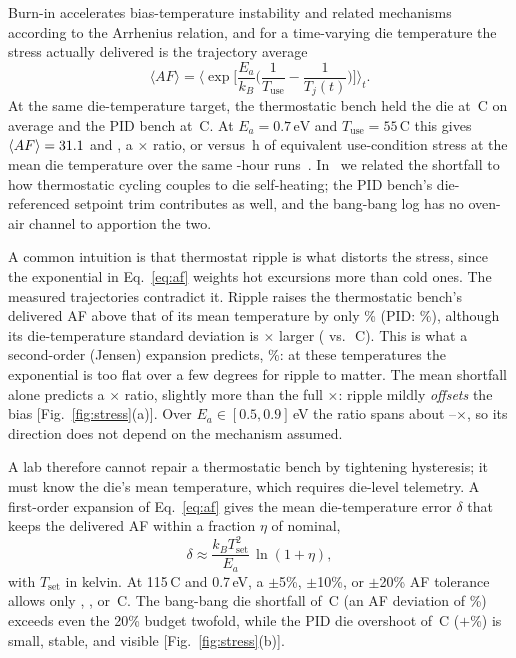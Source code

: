 \documentclass[10pt,twocolumn]{article}
\newcommand{\degC}{\,\textdegree C}
\newcommand{\unit}[1]{\,\mathrm{#1}}
\begin{document}
Burn-in accelerates bias-temperature instability and related mechanisms according to the Arrhenius relation, and for a time-varying die temperature the stress actually delivered is the trajectory average
\begin{equation}
\langle AF\rangle=\Big\langle \exp\!\Big[\frac{E_a}{k_B}\Big(\frac{1}{T_{\mathrm{use}}}-\frac{1}{T_j(t)}\Big)\Big]\Big\rangle_t .
\label{eq:af}
\end{equation}
At the same die-temperature target, the thermostatic bench held the die at \vTBB\degC{} on average and the PID bench at \vTPID\degC. At $E_a=0.7\unit{eV}$ and $T_{\mathrm{use}}=55$\degC{} this gives $\langle AF\rangle=31.1$ and \vAFPID, a \vAFratio$\times$ ratio, or \vEqhBB{} versus \vEqhPID\,h of equivalent use-condition stress at the mean die temperature over the same \vDurPair-hour runs~\cite{sbcci26}. In~\cite{sbcci26} we related the shortfall to how thermostatic cycling couples to die self-heating; the PID bench's die-referenced setpoint trim contributes as well, and the bang-bang log has no oven-air channel to apportion the two.

A common intuition is that thermostat ripple is what distorts the stress, since the exponential in Eq.~\eqref{eq:af} weights hot excursions more than cold ones. The measured trajectories contradict it. Ripple raises the thermostatic bench's delivered AF above that of its mean temperature by only \vRippleBB\% (PID: \vRipplePID\%), although its die-temperature standard deviation is \vTsdRatio$\times$ larger (\vTsdBB{} vs.\ \vTsdPID\degC). This is what a second-order (Jensen) expansion predicts, \vJensen\%: at these temperatures the exponential is too flat over a few degrees for ripple to matter. The mean shortfall alone predicts a \vAFratioMeanOnly$\times$ ratio, slightly more than the full \vAFratio$\times$: ripple mildly \emph{offsets} the bias [Fig.~\ref{fig:stress}(a)]. Over $E_a\in[0.5,0.9]$\,eV the ratio spans about \vAFratioLoOne--\vAFratioHiOne$\times$, so its direction does not depend on the mechanism assumed.

A lab therefore cannot repair a thermostatic bench by tightening hysteresis; it must know the die's mean temperature, which requires die-level telemetry. A first-order expansion of Eq.~\eqref{eq:af} gives the mean die-temperature error $\delta$ that keeps the delivered AF within a fraction $\eta$ of nominal,
\begin{equation}
\delta\approx\frac{k_B T_{\mathrm{set}}^2}{E_a}\,\ln(1+\eta),
\label{eq:delta}
\end{equation}
with $T_{\mathrm{set}}$ in kelvin. At 115\degC{} and 0.7\,eV, a $\pm$5\%, $\pm$10\%, or $\pm$20\% AF tolerance allows only \vDeltaFive, \vDeltaTen, or \vDeltaTwenty\degC. The bang-bang die shortfall of \vTerrBB\degC{} (an AF deviation of \vAFdevBB\%) exceeds even the 20\% budget twofold, while the PID die overshoot of \vTerrPID\degC{} ($+$\vAFdevPID\%) is small, stable, and visible [Fig.~\ref{fig:stress}(b)].
\end{document}
